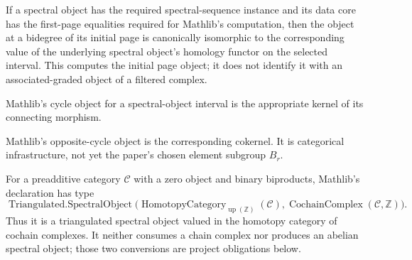 \begin{definition}
  \label{def:mathlib-spectral-sequence-first-page}
  \mathlibok
  If a spectral object has the required spectral-sequence instance and its
  data core has the first-page equalities required for Mathlib's computation,
  then the object at a bidegree of its initial page is canonically isomorphic
  to the corresponding value of the underlying spectral object's homology
  functor on the selected interval.  This computes the initial page object; it
  does not identify it with an associated-graded object of a filtered complex.
\end{definition}

\begin{definition}
  \label{def:mathlib-spectral-object-cycles}
  \mathlibok
  Mathlib's cycle object for a spectral-object interval is the appropriate
  kernel of its connecting morphism.
\end{definition}

\begin{definition}
  \label{def:mathlib-spectral-object-opcycles}
  \mathlibok
  Mathlib's opposite-cycle object is the corresponding cokernel.  It is
  categorical infrastructure, not yet the paper's chosen element subgroup
  $B_r$.
\end{definition}

\begin{definition}
  \label{def:mathlib-mapping-cone-spectral-object}
  \mathlibok
  For a preadditive category $\mathcal C$ with a zero object and binary
  biproducts, Mathlib's declaration has type
  \[
    \operatorname{Triangulated.SpectralObject}
      \bigl(\operatorname{HomotopyCategory}_{\operatorname{up}(\mathbb Z)}
      (\mathcal C),\operatorname{CochainComplex}(\mathcal C,\mathbb Z)\bigr).
  \]
  Thus it is a triangulated spectral object valued in the homotopy category of
  cochain complexes.  It neither consumes a chain complex nor produces an
  abelian spectral object; those two conversions are project obligations below.
\end{definition}

